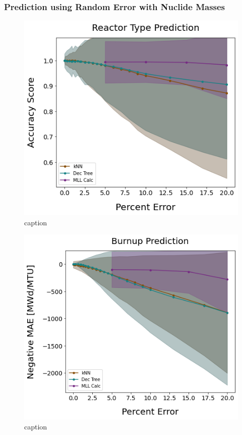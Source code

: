 \begin{frame}
  \frametitle{Prediction using Random Error with Nuclide Masses}
  \begin{minipage}{0.49\textwidth}
    \begin{figure}
      \centering
      \includegraphics[width=\linewidth]{./figures/randerr_compare_nuc29_rxtr.png}
      \caption{caption}
    \end{figure}
  \end{minipage}%
  \hfill
  \begin{minipage}{0.49\textwidth}
    \begin{figure}
      \centering
      \includegraphics[width=\linewidth]{./figures/randerr_compare_nuc29_burn.png}
      \caption{caption}
    \end{figure}
  \end{minipage}%
\end{frame}

